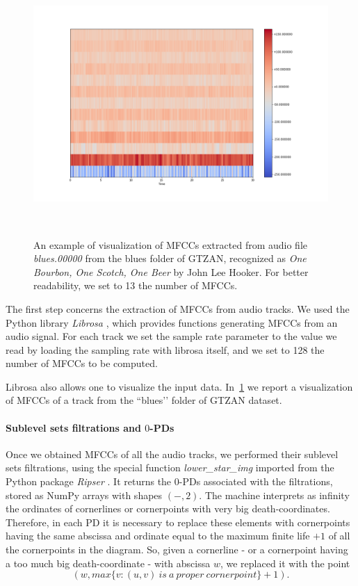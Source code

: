 \documentclass[english, LaM, oneside, noexaminfo]{sapthesis}
\begin{document}
\begin{figure}[tb]
\centering
\includegraphics[height=10cm]{testplot.png}
\caption{An example of visualization of MFCCs extracted from audio file \textit{blues.00000} from the blues folder of GTZAN, recognized as \textit{One Bourbon, One Scotch, One Beer} by John Lee Hooker. For better readability, we set to 13 the number of MFCCs.  }\label{fig:MFCCs_plot}
\end{figure}

The first step concerns the extraction of MFCCs from audio tracks. We used the Python library \textit{Librosa} \cite{brian_mcfee_2021_4792298}, which provides functions generating MFCCs from an audio signal. For each track we set the sample rate parameter to the value we read by loading the sampling rate with librosa itself, and we set to 128 the number of MFCCs to be computed. 

Librosa also allows one to visualize the input data. In~\cref{fig:MFCCs_plot} we report a visualization of MFCCs of a track from the ``blues’’ folder of GTZAN dataset. 

\paragraph{Sublevel sets filtrations and $0$-PDs}
Once we obtained MFCCs of all the audio tracks, we performed their sublevel sets filtrations, using the special function \textit{lower\_star\_img} imported from the Python package \textit{Ripser} \cite{ctralie2018ripser}. It returns the $0$-PDs associated with the filtrations, stored as NumPy arrays with shapes $(-,2)$.
The machine interprets as infinity the ordinates of cornerlines or cornerpoints with very big death-coordinates. Therefore, in each PD it is necessary to replace these elements with cornerpoints having the same abscissa and ordinate equal to the maximum finite life $+1$ of all the cornerpoints in the diagram. So, given a cornerline - or a cornerpoint having a too much big death-coordinate - with abscissa $w$, we replaced it with the point $$(w, max \{v : (u, v) \ is \ a \ proper \ cornerpoint\}+1).$$
\end{document}
